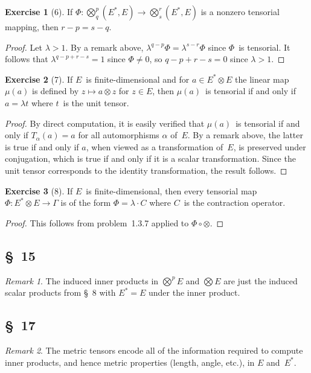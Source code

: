 \documentclass[letterpaper,12pt]{article}
\newcommand{\after}{\circ}
\newcommand{\mult}{\cdot}
\newcommand{\tprod}{\otimes}
\newcommand{\bigtprod}{\bigotimes}
\newcommand{\medtprod}{{\textstyle\bigtprod}}
\theoremstyle{definition}
\newtheorem*{exer}{Exercise}
\theoremstyle{remark}
\newtheorem*{rmk}{Remark}
\begin{document}
\begin{exer}[6]
If \(\Phi:\medtprod^p_q(E^*,E)\to\medtprod^r_s(E^*,E)\) is a nonzero tensorial mapping, then \(r-p=s-q\).
\end{exer}
\begin{proof}
Let \(\lambda>1\). By a remark above, \(\lambda^{q-p}\Phi=\lambda^{s-r}\Phi\) since \(\Phi\)~is tensorial. It follows that \(\lambda^{q-p+r-s}=1\) since \(\Phi\ne 0\), so \(q-p+r-s=0\) since \(\lambda>1\).
\end{proof}

\begin{exer}[7]
If \(E\)~is finite-dimensional and for \(a\in E^*\tprod E\) the linear map~\(\mu(a)\) is defined by \(z\mapsto a\tprod z\) for \(z\in E\), then \(\mu(a)\)~is tensorial if and only if \(a=\lambda t\) where \(t\)~is the unit tensor.
\end{exer}
\begin{proof}
By direct computation, it is easily verified that \(\mu(a)\)~is tensorial if and only if \(T_{\alpha}(a)=a\) for all automorphisms \(\alpha\) of~\(E\). By a remark above, the latter is true if and only if \(a\), when viewed as a transformation of~\(E\), is preserved under conjugation, which is true if and only if it is a scalar transformation. Since the unit tensor corresponds to the identity transformation, the result follows.
\end{proof}

\begin{exer}[8]
If \(E\)~is finite-dimensional, then every tensorial map \(\Phi:E^*\tprod E\to\Gamma\) is of the form \(\Phi=\lambda\mult C\) where \(C\)~is the contraction operator.
\end{exer}
\begin{proof}
This follows from problem~1.3.7 applied to \(\Phi\after\tprod\).
\end{proof}

\subsection*{\S~15}
\begin{rmk}
The induced inner products in \(\medtprod^p E\) and \(\medtprod E\) are just the induced scalar products from \S~8 with \(E^*=E\) under the inner product.
\end{rmk}

\subsection*{\S~17}
\begin{rmk}
The metric tensors encode all of the information required to compute inner products, and hence metric properties (length, angle, etc.), in \(E\) and~\(E^*\).
\end{rmk}
\end{document}
